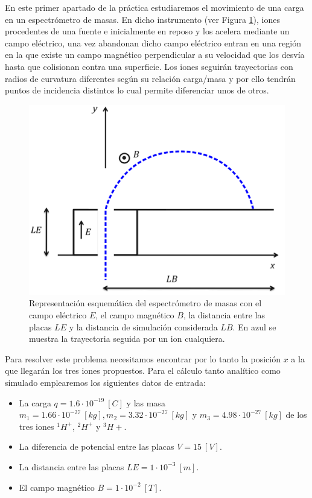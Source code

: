 \documentclass[journal]{IEEEtran}
\begin{document}
En este primer apartado de la práctica estudiaremos el movimiento de una carga en un espectrómetro de masas. En dicho instrumento (ver Figura \ref{fig:espetrometro}), iones procedentes de una fuente e inicialmente en reposo y los acelera mediante un campo eléctrico, una vez abandonan dicho campo eléctrico entran en una región en la que existe un campo magnético perpendicular a su velocidad que los desvía hasta que colisionan contra una superficie. Los iones seguirán trayectorias con radios de curvatura diferentes según su relación carga/masa y por ello tendrán puntos de incidencia distintos lo cual permite diferenciar unos de otros.

\begin{figure}[!htb]
    \includegraphics[width=\linewidth]{espectrometro.png}
    \caption{Representación esquemática del espectrómetro de masas con el campo eléctrico $E$, el campo magnético $B$, la distancia entre las placas $LE$ y la distancia de simulación considerada $LB$. En azul se muestra la trayectoria seguida por un ion cualquiera.}
    \label{fig:espetrometro}
\end{figure}

Para resolver este problema necesitamos encontrar por lo tanto la posición $x$ a la que llegarán los tres iones propuestos. Para el cálculo tanto analítico como simulado emplearemos los siguientes datos de entrada:

\begin{itemize}
    \item La carga $q = 1.6\cdot10^{-19}~[C]$ y las masa $m_1 = 1.66\cdot10^{-27}~[kg], m_2 = 3.32\cdot10^{-27}~[kg]$ y $m_3 = 4.98\cdot10^{-27}~[kg]$ de los tres iones $^1H^+$, $^2H^+$ y $^3H+$.
    \item La diferencia de potencial entre las placas $V = 15~[V]$.
    \item La distancia entre las placas $LE = 1\cdot 10^{-3}~[m]$.
    \item El campo magnético $B = 1\cdot10^{-2}~[T]$.
\end{itemize}
\end{document}
